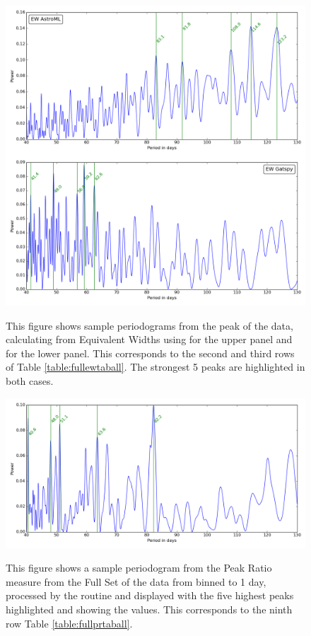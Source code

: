 \begin{figure}[!htbp]
\begin{center}
\includegraphics[scale=0.20]{Figures/summpgrams.png} \\
\end{center}   
\caption{This figure shows sample periodograms from the {\ha} peak of the {\harps} data, calculating from Equivalent
  Widths using {\astroml} for the upper panel and {\gatspy} for the lower panel. This corresponds to the second and
  third rows of Table \ref{table:fullewtaball}. The strongest 5 peaks are highlighted in both cases.}
\protect\label{fig:harpspgrams1}
\end{figure}

\begin{figure}[!htbp]
\begin{center}
\includegraphics[scale=0.40]{Figures/harpsprbind1.png} \\
\end{center}   
\caption{This figure shows a sample periodogram from the Peak Ratio measure from the Full Set of the data from {\harps}
  binned to 1 day, processed by the {\gatspy} routine and displayed with the five highest peaks highlighted and showing
  the values. This corresponds to the ninth row Table \ref{table:fullprtaball}.}
\protect\label{fig:harpspgrams2}
\end{figure}

